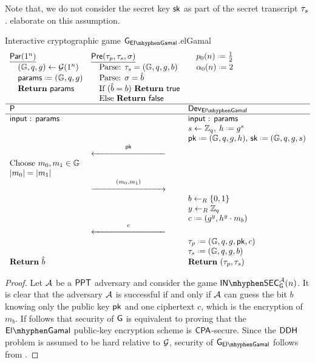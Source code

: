 Note that, we do not consider the secret key $\mathsf{sk}$ as part of the secret transcript $\tau_s$.  elaborate on this assumption. 

\begin{intGame}{Interactive cryptographic game $\cgame_{\elGamal}$.}{elGamal}
\begin{align*}
\begin{array}{lll}
\underline{\param(1^n)} & \underline{\pred(\ptrans,\strans,\sigma)} & \quad\basep(n)\defeq \frac{1}{2} \\
\quad(\cgroup,\order,\generator)\leftarrow\groupgen(1^n) & \quad\mbox{Parse: } \strans = (\cgroup,\order,\generator,b) & \quad\secf(n)\defeq 2 \\
\quad\params \defeq (\cgroup,q,g) & \quad\mbox{Parse: } \sigma = \hat{b} & \\
\quad\mbox{\Ret } \params & \quad\mbox{If } (\hat{b} = b) \mbox{ \Ret } \true & \\
 & \quad\mbox{Else \Ret } \false & \\
\hline \party &  & \dev_{\elGamal} \\ 
\hline \I: \, \params &  & \I:\,\params \\ 
 &  & s\leftarrow\Zq,\: h\defeq g^s \\
 & & \pk \defeq (\cgroup,\order,\generator,h),\, \sk \defeq (\cgroup,\order,\generator,s) \\
 & \longleftar{\pk}{3} &  \\
\mbox{Choose } m_0,m_1\in\cgroup & & \\
\vert m_0\vert = \vert m_1\vert & & \\
 & \longrightar{(m_0,m_1)}{3} & \\
 & & b\unileft\{0,1\} \\
 & & y \unileft\Zq \\
 & & c \defeq (g^y, h^y\cdot m_b) \\
 & \longleftar{c}{3} & \\
 & & \ptrans \defeq (\cgroup,\order,\generator,\pk,c) \\
 & & \strans \defeq (\cgroup,\order,\generator,b) \\
\Ret \hat{b} & & \Ret (\ptrans,\strans) \\
\end{array}   
\end{align*}
\end{intGame}

\begin{proof}
Let $\mathcal{A}$ be a $\mathsf{PPT}$ adversary and consider the game $\insecgame_{\cgame}^{\adve}(n)$. It is clear that the adversary $\mathcal{A}$ is successful if and only if $\mathcal{A}$ can guess the bit $b$ knowing only the public key $\mathsf{pk}$ and one ciphertext $c$, which is the encryption of $m_b$. If follows that security of $\operatorname{\mathsf{G}}$ is equivalent to proving that the $\elGamal$ public-key encryption scheme is $\mathsf{CPA}$-secure. Since the $\mathsf{DDH}$ problem is assumed to be hard relative to $\operatorname{\mathcal{G}}$, security of $\cgame_{\elGamal}$ follows from . 
\end{proof}

